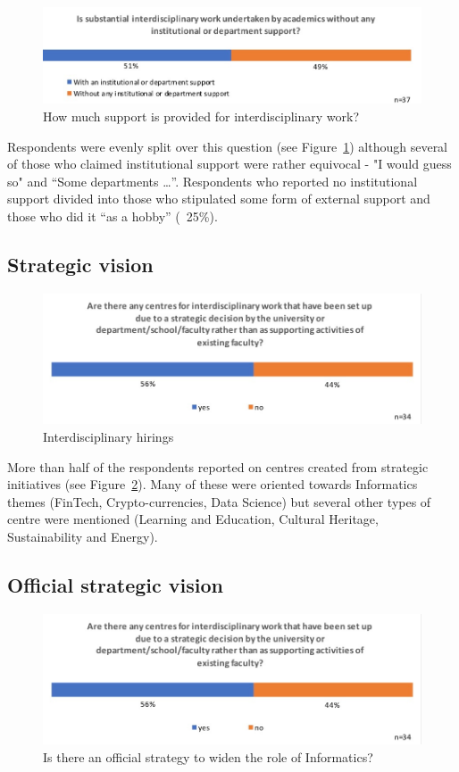 \begin{figure}[h]
\centering
\includegraphics[width = \linewidth]{charts/5h.jpg}
\caption{How much support is provided for interdisciplinary work?}
\label{sect5:support}
\end{figure}

Respondents were evenly split over this question (see Figure~\ref{sect5:support}) although several of those who claimed institutional support were rather equivocal - "I would guess so" and ``Some departments \ldots ''. Respondents who reported no institutional support divided into those who stipulated some form of external support and those who did it ``as a hobby'' (~25\%).

\subsection{Strategic vision }
\begin{figure}[h]
\centering
\includegraphics[width = \linewidth]{charts/5i.jpg}
\caption{Interdisciplinary hirings}
\label{sect5:strategy}
\end{figure}

More than half of the respondents reported on centres created from strategic initiatives (see Figure~\ref{sect5:strategy}). Many of these were oriented towards Informatics themes (FinTech, Crypto-currencies, Data Science) but several other types of centre were mentioned (Learning and Education, Cultural Heritage, Sustainability and Energy).

\subsection{Official strategic vision}
\begin{figure}[h]
\centering
\includegraphics[width = \linewidth]{charts/5i.jpg}
\caption{Is there an official strategy to widen the role of Informatics?}
\label{sect5:official}
\end{figure}

